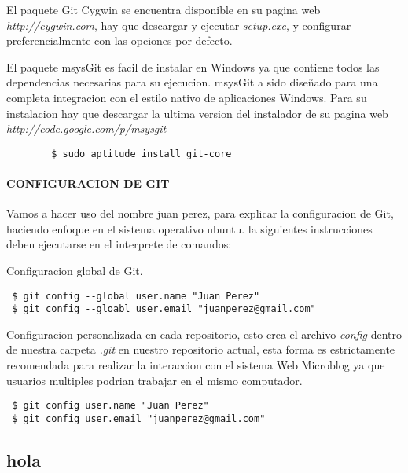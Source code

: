 El paquete Git Cygwin se encuentra disponible en su pagina web \textit{http://cygwin.com}, hay que descargar y ejecutar \textit{setup.exe}, y configurar preferencialmente
con las opciones por defecto.

El paquete msysGit es facil de instalar en Windows ya que contiene todos las dependencias necesarias para su ejecucion. msysGit a sido diseñado para una completa integracion 
con el estilo nativo de aplicaciones Windows. Para su instalacion hay que descargar la ultima version del instalador de su pagina web \textit{http://code.google.com/p/msysgit}

\begin{proc}
	\begin{verbatim}
 		$ sudo aptitude install git-core
	\end{verbatim}
\end{proc}
\paragraph{CONFIGURACION DE GIT}
Vamos a hacer uso del nombre juan perez, para explicar la configuracion de Git, haciendo enfoque en el sistema operativo ubuntu.
la siguientes instrucciones deben ejecutarse en el interprete de comandos:

Configuracion global de Git.
\begin{verbatim}
 $ git config --global user.name "Juan Perez"
 $ git config --gloabl user.email "juanperez@gmail.com"
\end{verbatim}
Configuracion personalizada en cada repositorio, esto crea el archivo \textit{config} dentro de nuestra carpeta \textit{.git} en nuestro repositorio actual, esta forma es
estrictamente recomendada para realizar la interaccion con el sistema Web Microblog ya que usuarios multiples podrian trabajar en el mismo computador.
\begin{verbatim}
 $ git config user.name "Juan Perez"
 $ git config user.email "juanperez@gmail.com"
\end{verbatim}

\subsection{hola}
%
